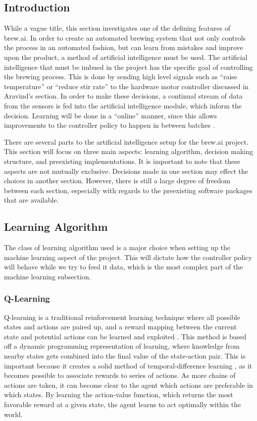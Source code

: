 \documentclass[draftclsnofoot,onecolumn,letterpaper,10pt]{IEEEtran}
\begin{document}
\subsection{Introduction}
While a vague title, this section investigates one of the defining features of brew.ai.
In order to create an automated brewing system that not only controls the process in an automated fashion, but can learn from mistakes and improve upon the product, a method of artificial intelligence must be used.
The artificial intelligence that must be imbued in the project has the specific goal of controlling the brewing process.
This is done by sending high level signals such as ``raise temperature'' or ``reduce stir rate'' to the hardware motor controller discussed in Aravind's section.
In order to make these decisions, a continual stream of data from the sensors is fed into the artificial intelligence module, which inform the decision.
Learning will be done in a ``online'' manner, since this allows improvements to the controller policy to happen in between batches \cite{RussellNorvig}.

There are several parts to the artificial intelligence setup for the brew.ai project.
This section will focus on three main aspects: learning algorithm, decision making structure, and preexisting implementations.
It is important to note that these aspects are not mutually exclusive. 
Decisions made in one section may effect the choices in another section.
However, there is still a large degree of freedom between each section, especially with regards to the preexisting software packages that are available.

\subsection{Learning Algorithm}
The class of learning algorithm used is a major choice when setting up the machine learning aspect of the project.
This will dictate how the controller policy will behave while we try to feed it data, which is the most complex part of the machine learning subsection.
\subsubsection{Q-Learning}
Q-learning is a traditional reinforcement learning technique where all possible states and actions are paired up, and a reward mapping between the current state and potential actions can be learned and exploited \cite{SuttonBarto}.
This method is based off a dynamic programming representation of learning, where knowledge from nearby states gets combined into the final value of the state-action pair.
This is important because it creates a solid method of temporal-difference learning \cite{SuttonBarto}, as it becomes possible to associate rewards to series of actions.
As more chains of actions are taken, it can become clear to the agent which actions are preferable in which states.
By learning the action-value function, which returns the most favorable reward at a given state, the agent learns to act optimally within the world.
\end{document}
